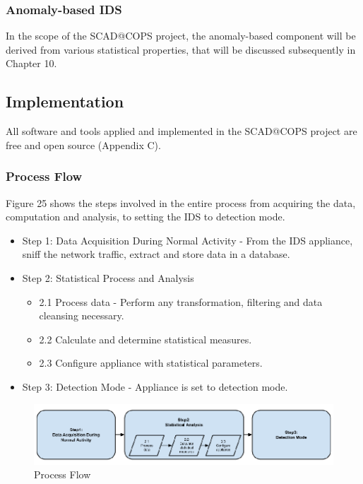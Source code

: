 \documentclass[11pt,]{article}
\begin{document}
\subsubsection{Anomaly-based IDS}\label{anomaly-based-ids}

In the scope of the SCAD@COPS project, the anomaly-based component will
be derived from various statistical properties, that will be discussed
subsequently in Chapter 10.

\subsection{Implementation}\label{implementation}

All software and tools applied and implemented in the SCAD@COPS project
are free and open source (Appendix C).

\subsubsection{Process Flow}\label{process-flow}

Figure 25 shows the steps involved in the entire process from acquiring
the data, computation and analysis, to setting the IDS to detection
mode.

\begin{itemize}
\itemsep1pt\parskip0pt
\item
  Step 1: Data Acquisition During Normal Activity - From the IDS
  appliance, sniff the network traffic, extract and store data in a
  database.
\item
  Step 2: Statistical Process and Analysis

  \begin{itemize}
  \itemsep1pt\parskip0pt
  \item
    2.1 Process data - Perform any transformation, filtering and data
    cleansing necessary.
  \item
    2.2 Calculate and determine statistical measures.
  \item
    2.3 Configure appliance with statistical parameters.
  \end{itemize}
\item
  Step 3: Detection Mode - Appliance is set to detection mode.
\end{itemize}

\begin{figure}[bottom]

{\centering \includegraphics{thesis_files/figure-latex/unnamed-chunk-37-1} 

}

\caption{Process Flow}\label{fig:unnamed-chunk-37}
\end{figure}
\end{document}
